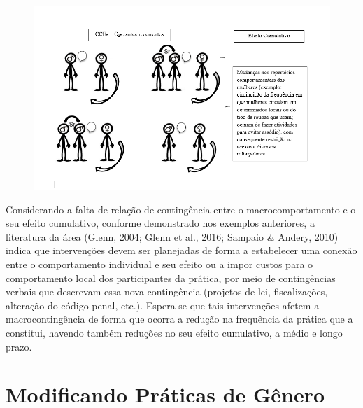 \begin{figure}[h]
    \begin{center}
        \includegraphics[width=1\textwidth]{7/figura4}
        \label{figura4}
\end{center}
\end{figure}

Considerando a falta de relação de contingência entre o macrocomportamento e o seu efeito cumulativo, conforme demonstrado nos exemplos anteriores, a literatura da área (Glenn, 2004; Glenn et al., 2016; Sampaio \& Andery, 2010) indica que intervenções devem ser planejadas de forma a estabelecer uma conexão entre o comportamento individual e seu efeito ou a impor custos para o comportamento local dos participantes da prática, por meio de contingências verbais que descrevam essa nova contingência (projetos de lei, fiscalizações, alteração do código penal, etc.). Espera-se que tais intervenções afetem a macrocontingência de forma que ocorra a redução na frequência da prática que a constitui, havendo também reduções no seu efeito cumulativo, a médio e longo prazo.

\section{Modificando Práticas de Gênero}

